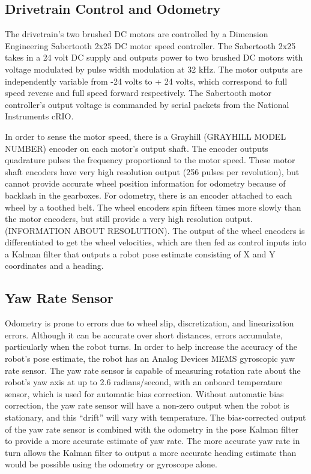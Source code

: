 \documentclass{cwru}
\begin{document}
\subsection[Drivetrain Control and Odometry]{Drivetrain Control and Odometry}
The drivetrain{\textquoteright}s two brushed DC motors are controlled by a Dimension Engineering Sabertooth 2x25 DC motor speed controller. The Sabertooth 2x25 takes in a 24 volt DC supply and outputs power to two brushed DC motors with voltage modulated by pulse width modulation at 32 kHz. The motor outputs are independently variable from -24 volts to + 24 volts, which correspond to full speed reverse and full speed forward respectively. The Sabertooth motor controller{\textquoteright}s output voltage is commanded by serial packets from the National Instruments cRIO.

In order to sense the motor speed, there is a Grayhill (GRAYHILL MODEL NUMBER) encoder on each motor{\textquoteright}s output shaft. The encoder outputs quadrature pulses the frequency proportional to the motor speed. These motor shaft encoders have very high resolution output (256 pulses per revolution), but cannot provide accurate wheel position information for odometry because of backlash in the gearboxes. For odometry, there is an encoder attached to each wheel by a toothed belt. The wheel encoders spin fifteen times more slowly than the motor encoders, but still provide a very high resolution output. (INFORMATION ABOUT RESOLUTION). The output of the wheel encoders is differentiated to get the wheel velocities, which are then fed as control inputs into a Kalman filter that outputs a robot pose estimate consisting of X and Y coordinates and a heading.

\subsection[Yaw Rate Sensor]{Yaw Rate Sensor}
Odometry is prone to errors due to wheel slip, discretization, and linearization errors. Although it can be accurate over short distances, errors accumulate, particularly when the robot turns. In order to help increase the accuracy of the robot{\textquoteright}s pose estimate, the robot has an Analog Devices MEMS gyroscopic yaw rate sensor. The yaw rate sensor is capable of measuring rotation rate about the robot{\textquoteright}s yaw axis at up to 2.6 radians/second, with an onboard temperature sensor, which is used for automatic bias correction. Without automatic bias correction, the yaw rate sensor will have a non-zero output when the robot is stationary, and this {\textquotedblleft}drift{\textquotedblright} will vary with temperature. The bias-corrected output of the yaw rate sensor is combined with the odometry in the pose Kalman filter to provide a more accurate estimate of yaw rate. The more accurate yaw rate in turn allows the Kalman filter to output a more accurate heading estimate than would be possible using the odometry or gyroscope alone.
\end{document}
